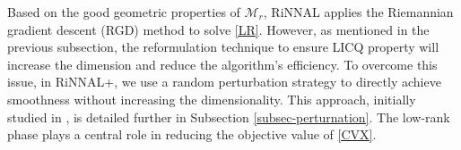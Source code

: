 \documentclass[11pt]{article}
\theoremstyle{plain}
\def\M{\mathcal{M}}
\begin{document}
Based on the good geometric properties of $\M_r$, RiNNAL applies the Riemannian gradient descent (RGD) method to solve \eqref{LR}. However, as mentioned in the previous subsection, the reformulation technique to ensure LICQ property will increase the dimension and reduce the algorithm's efficiency. To overcome this issue, in RiNNAL+, we use a random perturbation strategy to directly achieve smoothness without increasing the dimensionality. This approach, initially studied in \cite{tang2023feasible}, is detailed further in Subsection \ref{subsec-perturnation}. The low-rank phase plays a central role in reducing the objective value of \eqref{CVX}.

\medskip

\end{document}
